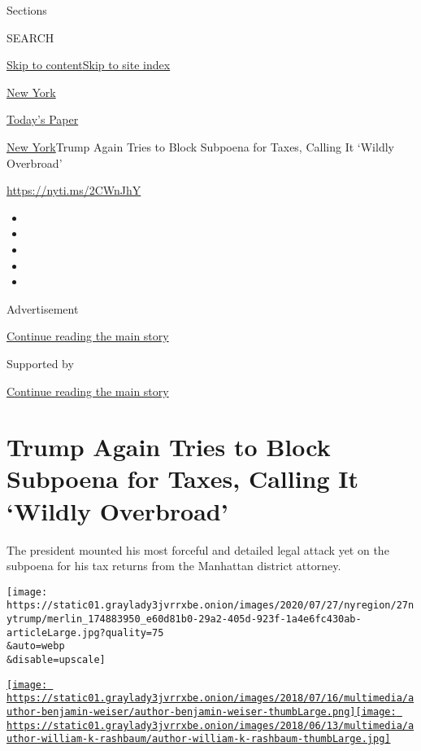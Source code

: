 Sections

SEARCH

\protect\hyperlink{site-content}{Skip to
content}\protect\hyperlink{site-index}{Skip to site index}

\href{https://www.nytimes3xbfgragh.onion/section/nyregion}{New York}

\href{https://myaccount.nytimes3xbfgragh.onion/auth/login?response_type=cookie\&client_id=vi}{}

\href{https://www.nytimes3xbfgragh.onion/section/todayspaper}{Today's
Paper}

\href{/section/nyregion}{New York}\textbar{}Trump Again Tries to Block
Subpoena for Taxes, Calling It `Wildly Overbroad'

\url{https://nyti.ms/2CWnJhY}

\begin{itemize}
\item
\item
\item
\item
\item
\end{itemize}

Advertisement

\protect\hyperlink{after-top}{Continue reading the main story}

Supported by

\protect\hyperlink{after-sponsor}{Continue reading the main story}

\hypertarget{trump-again-tries-to-block-subpoena-for-taxes-calling-it-wildly-overbroad}{%
\section{Trump Again Tries to Block Subpoena for Taxes, Calling It
`Wildly
Overbroad'}\label{trump-again-tries-to-block-subpoena-for-taxes-calling-it-wildly-overbroad}}

The president mounted his most forceful and detailed legal attack yet on
the subpoena for his tax returns from the Manhattan district attorney.

\texttt{[image: https://static01.graylady3jvrrxbe.onion/images/2020/07/27/nyregion/27nytrump/merlin\_174883950\_e60d81b0-29a2-405d-923f-1a4e6fc430ab-articleLarge.jpg?quality=75\\\&auto=webp\\\&disable=upscale]}

\href{https://www.nytimes3xbfgragh.onion/by/benjamin-weiser}{\texttt{[image: https://static01.graylady3jvrrxbe.onion/images/2018/07/16/multimedia/author-benjamin-weiser/author-benjamin-weiser-thumbLarge.png]}}\href{https://www.nytimes3xbfgragh.onion/by/william-k-rashbaum}{\texttt{[image: https://static01.graylady3jvrrxbe.onion/images/2018/06/13/multimedia/author-william-k-rashbaum/author-william-k-rashbaum-thumbLarge.jpg]}}

